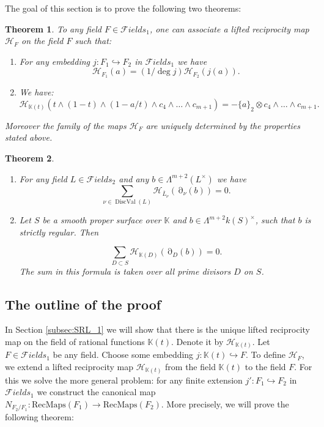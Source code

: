 \documentclass[12pt]{extarticle}
\newtheorem{theorem}{Theorem}[section]
\def\mb{\mathbb}
\def\mc{\mathcal}
\def\L{\Lambda}
\def\k{\mb K}
\def\t{\times}
\def\emb{\hookrightarrow}
\def\ol{\overline}
\def\wdw{\wedge\dots\wedge}
\def\F{{\mc Fields}}
\newcommand{\SRL}{\mathrm{RecMaps}}
\DeclareMathOperator{\ts}{\partial}
\DeclareMathOperator{\dval}{DiscVal}
\begin{document}
 The goal of this section is to prove the following two theorems:

\begin{theorem}
\label{th:strong_suslin_reciprocity_law_field}
    To any field $F\in\F_1$, one can associate a lifted reciprocity map $\mc H_F$ on the field $F$ such that:
    \begin{enumerate}
        \item For any embedding $j\colon F_1\emb F_2$ in $\F_1$ we have $$\mc H_{F_1}(a)=(1/\deg j)\mc H_{F_2}(j(a)).$$
        \item We have: $$\mc H_{\k(t)}(t\wedge (1-t)\wedge (1-a/t)\wedge c_4\wdw c_{m+1})=-\{a\}_2\otimes c_4\wdw c_{m+1}.$$
    \end{enumerate}
    Moreover the family of the maps $\mc H_F$ are uniquely determined by the properties stated above.
    \end{theorem}


    \begin{theorem}
    \label{th:two_dimensional_reciprocity_law}
        \begin{enumerate}
            \item For any field $L\in\F_2$ and any $b\in\L^{m+2}(L^\t)$ we have
$$\sum\limits_{\nu\in\dval(L)}\mc H_{\ol L_\nu}(\ts_\nu(b))=0.$$
           \item Let $S$ be a smooth proper surface over $\k$ and $b\in\L^{m+2} k(S)^\t$, such that $b$ is strictly regular. Then

            
            $$\sum\limits_{D\subset S}\mc H_{\k(D)}(\ts_D(b))=0.$$
            The sum in this formula is taken over all prime divisors $D$ on $S$.
        \end{enumerate}
        
    \end{theorem}

\subsection{The outline of the proof}
In Section \ref{subsec:SRL_1} we will show that there is the unique lifted reciprocity map on the field of rational functions $\k(t)$. Denote it by $\mc H_{\k(t)}$. Let $F\in\F_1$ be any field. Choose some embedding $j\colon \k(t)\emb F$. To define $\mathcal H_F$, we extend a lifted reciprocity map $\mathcal H_{\k(t)}$ from the field $\k(t)$ to the field $F$. For this we solve the more general problem: for any finite extension $j'\colon F_1\emb F_2$ in $\F_1$ we construct the canonical map $N_{F_2/F_1}\colon \SRL(F_1)\to \SRL(F_2)$. More precisely, we will prove the following theorem:
\end{document}

